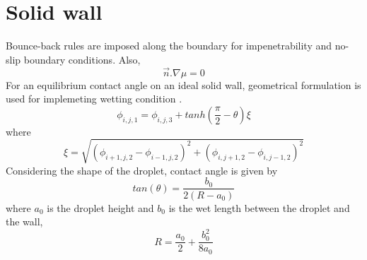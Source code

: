 \documentclass{article}
\begin{document}
\section{Solid wall}
Bounce-back rules \cite{paper:bounce_back} are imposed along the boundary for impenetrability and no-slip boundary conditions. Also,
\begin{equation}
	\vec{n}.\nabla\mu = 0
\end{equation}
 For an equilibrium contact angle on an ideal solid wall, geometrical formulation is used for implemeting wetting condition \cite{paper:contact_angle}.
 \begin{equation}
 \phi_{i,j,1} = \phi_{i,j,3} + tanh(\frac{\pi}{2}-\theta) \xi
 \end{equation}
 where 
 \begin{equation}
 	\xi = \sqrt{(\phi_{i+1,j,2}-\phi_{i-1,j,2})^{2}+(\phi_{i,j+1,2}-\phi_{i,j-1,2})^{2}}
 \end{equation}
 Considering the shape of the droplet, contact angle is given by\cite{paper:geometrical_contact_anngle} 
 \begin{equation}
 	tan(\theta) = \frac{b_{0}}{2(R-a_{0})}
 \end{equation}
 where $ a_{0} $ is the droplet height and $ b_{0} $ is the wet length between the droplet and the wall,
 \begin{equation}
 R = \frac{a_{0}}{2} + \frac{b_{0}^{2}}{8a_{0}}
 \end{equation}
\end{document}
